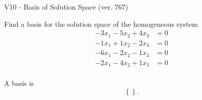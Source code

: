\begin{exercise}
  \begin{exerciseTitle}V10 - Basis of Solution Space (ver. 767)\end{exerciseTitle}
  \begin{exerciseStatement}
    Find a basis for the solution space of the homogeneous system 
\begin{align*}
 -3 x_ 1 -5 x_ 2 + 4 x_ 3 &= 0  \\ 
  -1 x_ 1 + 1 x_ 2 -2 x_ 3 &= 0  \\ 
  -6 x_ 1 -2 x_ 2 -1 x_ 3 &= 0  \\ 
  -2 x_ 1 -4 x_ 2 + 1 x_ 3 &= 0  \\ 
 \end{align*}


 
  \end{exerciseStatement}

  \begin{exerciseAnswer}
   A basis is   
\[\left\{\right\}.\]

  


  \end{exerciseAnswer}
\end{exercise}